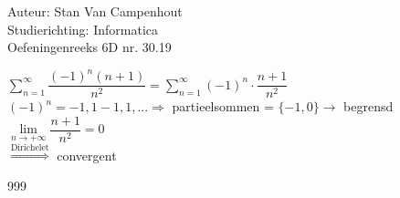 \documentclass[a4paper]{article}
\begin{document}
  
\noindent \large Auteur: Stan Van Campenhout \\
\noindent \large Studierichting:  Informatica\\
\noindent \large Oefeningenreeks 6D nr. 30.19\\

\medskip

\normalsize

$ \displaystyle\sum\limits_{n = 1}^\infty \dfrac{\left(-1\right)^n\left(n+1\right)}{n^2} = \displaystyle\sum\limits_{n = 1}^\infty \left(-1\right)^n\cdot\dfrac{n+1}{n^2} $\\

$ \left(-1\right)^n = -1, 1 -1, 1, ... \Rightarrow $ partieelsommen = $ \{-1, 0\} \rightarrow $ begrensd \\

$ \lim\limits_{n \rightarrow +\infty}\dfrac{n + 1}{n^2} = 0 $\\

$ \stackrel{\text{Dirichelet}}{\Rightarrow} $ convergent \\

\begin{thebibliography}{999}
\end{thebibliography}
\end{document}
